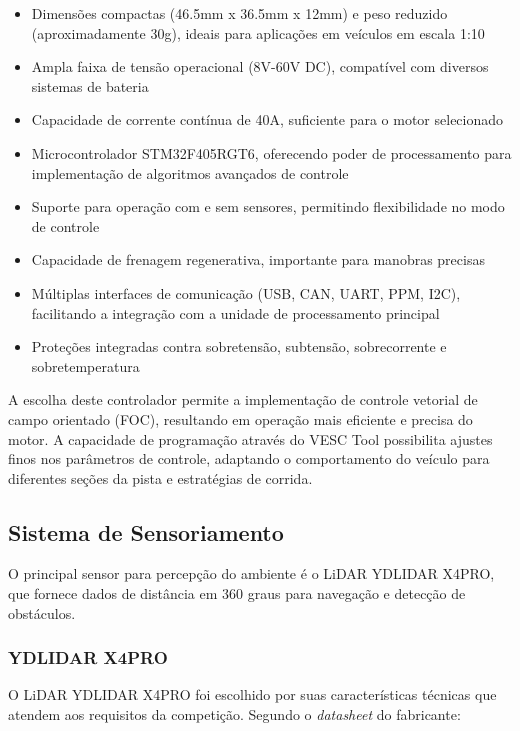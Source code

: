 \begin{itemize}
      \item Dimensões compactas (46.5mm x 36.5mm x 12mm) e peso reduzido (aproximadamente
            30g), ideais para aplicações em veículos em escala 1:10
      \item Ampla faixa de tensão operacional (8V-60V DC), compatível com diversos sistemas
            de bateria
      \item Capacidade de corrente contínua de 40A, suficiente para o motor selecionado
      \item Microcontrolador STM32F405RGT6, oferecendo poder de processamento para
            implementação de algoritmos avançados de controle
      \item Suporte para operação com e sem sensores, permitindo flexibilidade no modo de
            controle
      \item Capacidade de frenagem regenerativa, importante para manobras precisas
      \item Múltiplas interfaces de comunicação (USB, CAN, UART, PPM, I2C), facilitando a
            integração com a unidade de processamento principal
      \item Proteções integradas contra sobretensão, subtensão, sobrecorrente e
            sobretemperatura
\end{itemize}

A escolha deste controlador permite a implementação de controle vetorial de
campo orientado (FOC), resultando em operação mais eficiente e precisa do
motor. A capacidade de programação através do VESC Tool possibilita ajustes
finos nos parâmetros de controle, adaptando o comportamento do veículo para
diferentes seções da pista e estratégias de corrida.

\subsection{Sistema de Sensoriamento}

O principal sensor para percepção do ambiente é o LiDAR YDLIDAR X4PRO, que
fornece dados de distância em 360 graus para navegação e detecção de
obstáculos.

\subsubsection{YDLIDAR X4PRO}

O LiDAR YDLIDAR X4PRO foi escolhido por suas características técnicas que
atendem aos requisitos da competição. Segundo o \textit{datasheet} do
fabricante:

